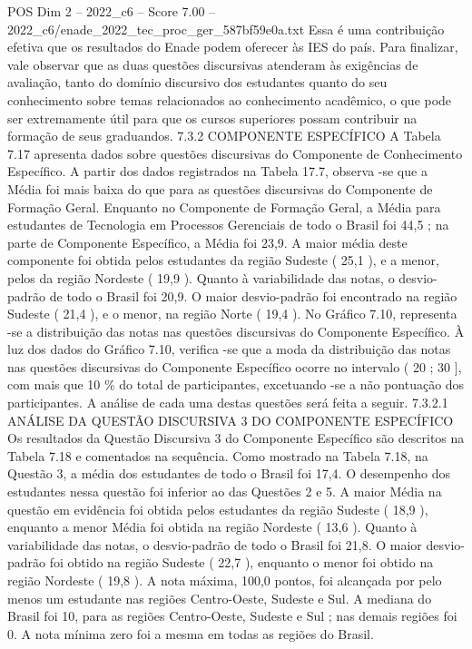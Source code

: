 \begin{textsample}{POS Dim 2 – 2022\_c6 – Score 7.00 – 2022\_c6/enade\_2022\_tec\_proc\_ger\_587bf59e0a.txt}
Essa é uma contribuição efetiva que os resultados do Enade podem oferecer às IES do país.
Para finalizar, vale observar que as duas questões discursivas atenderam às exigências de avaliação, tanto do domínio discursivo dos estudantes quanto do seu conhecimento sobre temas relacionados ao conhecimento acadêmico, o que pode ser extremamente útil para que os cursos superiores possam contribuir na formação de seus graduandos. 7.3.2 COMPONENTE ESPECÍFICO A Tabela 7.17 apresenta dados sobre questões discursivas do Componente de Conhecimento Específico.
A partir dos dados registrados na Tabela 17.7, observa -se que a Média foi mais baixa do que para as questões discursivas do Componente de Formação Geral.
Enquanto no Componente de Formação Geral, a Média para estudantes de Tecnologia em Processos Gerenciais de todo o Brasil foi 44,5 ; na parte de Componente Específico, a Média foi 23,9.
A maior média deste componente foi obtida pelos estudantes da região Sudeste ( 25,1 ), e a menor, pelos da região Nordeste ( 19,9 ).
Quanto à variabilidade das notas, o desvio-padrão de todo o Brasil foi 20,9.
O maior desvio-padrão foi encontrado na região Sudeste ( 21,4 ), e o menor, na região Norte ( 19,4 ).
No Gráfico 7.10, representa -se a distribuição das notas nas questões discursivas do Componente Específico.
À luz dos dados do Gráfico 7.10, verifica -se que a moda da distribuição das notas nas questões discursivas do Componente Específico ocorre no intervalo ( 20 ; 30 ], com mais que 10 \% do total de participantes, excetuando -se a não pontuação dos participantes.
A análise de cada uma destas questões será feita a seguir. 7.3.2.1 ANÁLISE DA QUESTÃO DISCURSIVA 3 DO COMPONENTE ESPECÍFICO Os resultados da Questão Discursiva 3 do Componente Específico são descritos na Tabela 7.18 e comentados na sequência.
Como mostrado na Tabela 7.18, na Questão 3, a média dos estudantes de todo o Brasil foi 17,4.
O desempenho dos estudantes nessa questão foi inferior ao das Questões 2 e 5.
A maior Média na questão em evidência foi obtida pelos estudantes da região Sudeste ( 18,9 ), enquanto a menor Média foi obtida na região Nordeste ( 13,6 ).
Quanto à variabilidade das notas, o desvio-padrão de todo o Brasil foi 21,8.
O maior desvio-padrão foi obtido na região Sudeste ( 22,7 ), enquanto o menor foi obtido na região Nordeste ( 19,8 ).
A nota máxima, 100,0 pontos, foi alcançada por pelo menos um estudante nas regiões Centro-Oeste, Sudeste e Sul.
A mediana do Brasil foi 10, para as regiões Centro-Oeste, Sudeste e Sul ; nas demais regiões foi 0.
A nota mínima zero foi a mesma em todas as regiões do Brasil.

\end{textsample}
